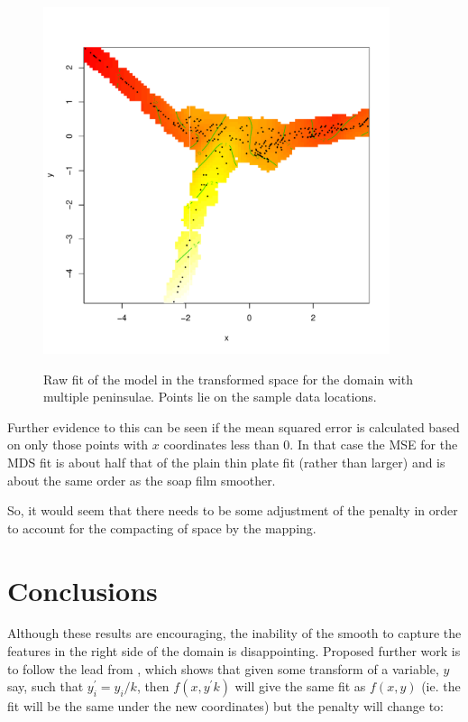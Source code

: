 \documentclass[a4paper,10pt]{article}
\begin{document}
\begin{figure}
\centering
\includegraphics[width=4in]{figs/wt2-visgam.pdf}\\
\caption{Raw fit of the model in the transformed space for the domain with multiple peninsulae. Points lie on the sample data locations.}
\label{wt2-visgam}
\end{figure}

Further evidence to this can be seen if the mean squared error is calculated based on only those points with $x$ coordinates less than 0. In that case the MSE for the MDS fit is about half that of the plain thin plate fit (rather than larger) and is about the same order as the soap film smoother.

So, it would seem that there needs to be some adjustment of the penalty in order to account for the compacting of space by the mapping.

\section{Conclusions}

Although these results are encouraging, the inability of the smooth to capture the features in the right side of the domain is disappointing. Proposed further work is to follow the lead from \cite{wood2000}, which shows that given some transform of a variable, $y$ say, such that $y_i^\prime=y_i/k$, then $f(x,y^\prime k)$ will give the same fit as $f(x,y)$ (ie. the fit will be the same under the new coordinates) but the penalty will change to:
\end{document}
